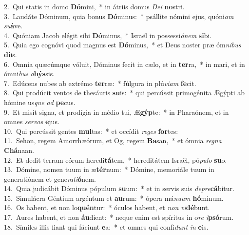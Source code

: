 {2.~}Qui statis in domo \textbf{Dó}mini,~* in átriis domus \textit{De}\textit{i} \textbf{no}stri.\\
{3.~}Laudáte Dóminum, quia bonus \textbf{Dó}minus:~* psállite nómini ejus, quóni\textit{am} \textit{su}\textbf{á}ve.\\
{4.~}Quóniam Jacob elégit sibi \textbf{Dó}minus,~* Israël in possessi\textit{ó}\textit{nem} \textbf{si}bi.\\
{5.~}Quia ego cognóvi quod magnus est \textbf{Dó}minus,~* et Deus noster præ óm\textit{ni}\textit{bus} \textbf{di}is.\\
{6.~}Omnia quæcúmque vóluit, Dóminus fecit in cælo, et in \textbf{ter}ra,~* in mari, et in ómni\textit{bus} \textit{a}\textbf{býs}sis.\\
{7.~}Edúcens nubes ab extrémo \textbf{ter}ræ:~* fúlgura in plú\textit{vi}\textit{am} \textbf{fe}cit.\\
{8.~}Qui prodúcit ventos de thesáuris \textbf{su}is:~* qui percússit primogénita Ægýpti ab hómine us\textit{que} \textit{ad} \textbf{pe}cus.\\
{9.~}Et misit signa, et prodígia in médio tui, Æ\textbf{gýp}te:~* in Pharaónem, et in omnes \textit{ser}\textit{vos} \textbf{e}jus.\\
{10.~}Qui percússit gentes \textbf{mul}tas:~* et occídit \textit{re}\textit{ges} \textbf{for}tes:\\
{11.~}Sehon, regem Amorrhæórum, et Og, regem \textbf{Ba}san,~* et ómnia \textit{re}\textit{gna} \textbf{Chá}naan.\\
{12.~}Et dedit terram eórum heredi\textbf{tá}tem,~* hereditátem Israël, pó\textit{pu}\textit{lo} \textbf{su}o.\\
{13.~}Dómine, nomen tuum in æ\textbf{tér}num:~* Dómine, memoriále tuum in generatiónem et gene\textit{ra}\textit{ti}\textbf{ó}nem.\\
{14.~}Quia judicábit Dóminus pópulum \textbf{su}um:~* et in servis suis \textit{de}\textit{pre}\textbf{cá}bitur.\\
{15.~}Simulácra Géntium argéntum et \textbf{au}rum:~* ópera má\textit{nu}\textit{um} \textbf{hó}minum.\\
{16.~}Os habent, et non lo\textbf{quén}tur:~* óculos habent, et \textit{non} \textit{vi}\textbf{dé}bunt.\\
{17.~}Aures habent, et non \textbf{áu}dient:~* neque enim est spíritus in o\textit{re} \textit{i}\textbf{psó}rum.\\
{18.~}Símiles illis fiant qui fáciunt \textbf{e}a:~* et omnes qui confí\textit{dunt} \textit{in} \textbf{e}is.\\
